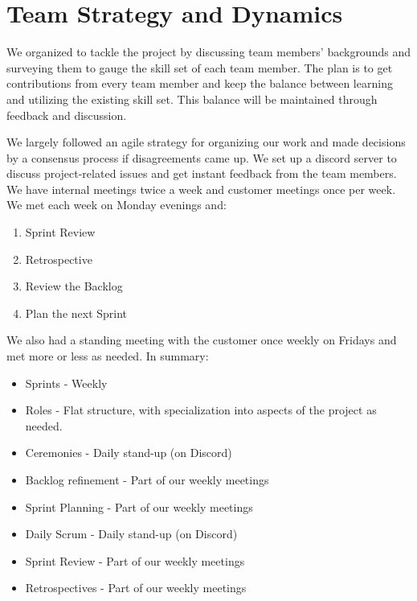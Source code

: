 \section{Team Strategy and Dynamics}

We organized to tackle the project by discussing team members’ backgrounds and surveying them to gauge the skill set of each team member. The plan is to get contributions from every team member and keep the balance between learning and utilizing the existing skill set. This balance will be maintained through feedback and discussion.

We largely followed an agile strategy for organizing our work and made decisions by a consensus process if disagreements came up. We set up a discord server to discuss project-related issues and get instant feedback from the team members. We have internal meetings twice a week and customer meetings once per week. We met each week on Monday evenings and:
\begin{enumerate}
    \item Sprint Review
    \item Retrospective
    \item Review the Backlog
    \item Plan the next Sprint
\end{enumerate}
We also had a standing meeting with the customer once weekly on Fridays and met more or less as needed. In summary:
\begin{itemize}
    \item Sprints - Weekly
    \item Roles - Flat structure, with specialization into aspects of the project as needed.
    \item Ceremonies - Daily stand-up (on Discord)
    \item Backlog refinement - Part of our weekly meetings
    \item Sprint Planning - Part of our weekly meetings
    \item Daily Scrum - Daily stand-up (on Discord)
    \item Sprint Review - Part of our weekly meetings
    \item Retrospectives - Part of our weekly meetings
\end{itemize}
